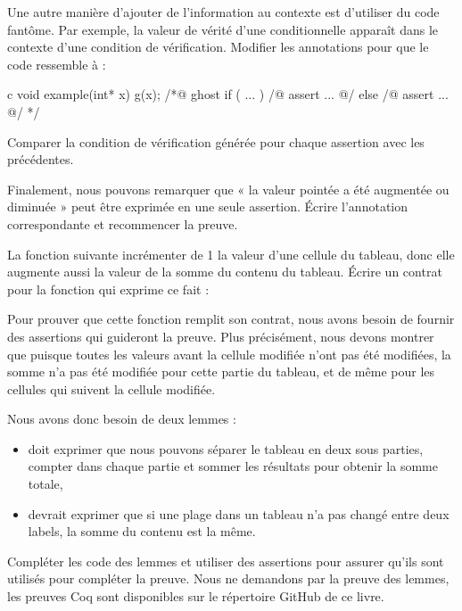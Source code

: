 Une autre manière d'ajouter de l'information au contexte est d'utiliser du
code fantôme. Par exemple, la valeur de vérité d'une conditionnelle apparaît
dans le contexte d'une condition de vérification. Modifier les annotations pour
que le code ressemble à :


\begin{CodeBlock}{c}
void example(int* x){
  g(x);
  /*@ ghost
   if ( ... ){
    /@ assert ... @/
   } else {
    /@ assert ... @/
   }
  */
}
\end{CodeBlock}

Comparer la condition de vérification générée pour chaque assertion avec les
précédentes.


Finalement, nous pouvons remarquer que « la valeur pointée a été augmentée ou
diminuée » peut être exprimée en une seule assertion. Écrire l'annotation
correspondante et recommencer la preuve.


\label{l4:proof-methodologies-triggering-lemmas-exercises-sum}


La fonction suivante incrémenter de 1 la valeur d'une cellule du tableau, donc
elle augmente aussi la valeur de la somme du contenu du tableau. Écrire un contrat
pour la fonction qui exprime ce fait :




Pour prouver que cette fonction remplit son contrat, nous avons besoin de fournir
des assertions qui guideront la preuve. Plus précisément, nous devons montrer que
puisque toutes les valeurs avant la cellule modifiée n'ont pas été modifiées, la
somme n'a pas été modifiée pour cette partie du tableau, et de même pour les
cellules qui suivent la cellule modifiée.


Nous avons donc besoin de deux lemmes :

\begin{itemize}
    \item {} doit exprimer que nous pouvons séparer le
          tableau en deux sous parties, compter dans chaque partie et sommer les
          résultats pour obtenir la somme totale,
    \item {} devrait exprimer que si une plage dans un
          tableau n'a pas changé entre deux labels, la somme du contenu est la
          même.
\end{itemize}


Compléter les code des lemmes et utiliser des assertions pour assurer qu'ils sont
utilisés pour compléter la preuve. Nous ne demandons par la preuve des lemmes, les
preuves Coq sont disponibles sur le répertoire GitHub de ce livre.
